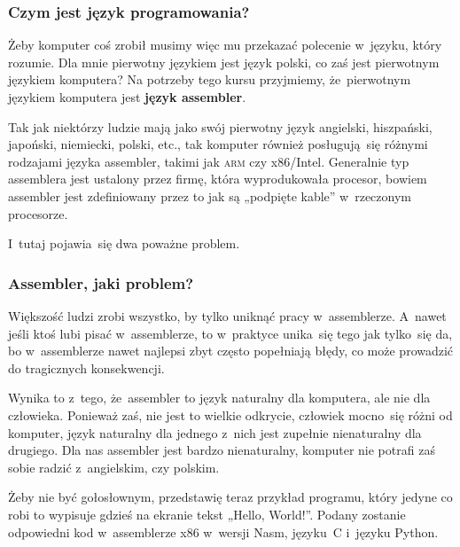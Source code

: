 \documentclass[10pt,t]{beamer}
\begin{document}
\begin{frame}
  \frametitle{Czym jest język programowania?}


  Żeby komputer coś zrobił musimy więc mu przekazać polecenie w~języku,
  który rozumie. Dla mnie pierwotny językiem jest język polski, co zaś
  jest pierwotnym językiem komputera? Na potrzeby tego kursu przyjmiemy,
  że~pierwotnym językiem komputera jest \textbf{język assembler}.

  Tak jak niektórzy ludzie mają jako swój pierwotny język angielski,
  hiszpański, japoński, niemiecki, polski, etc., tak komputer również
  posługują~się różnymi rodzajami języka assembler, takimi jak \textsc{arm}
  czy x86/Intel. Generalnie typ assemblera jest ustalony przez firmę, która
  wyprodukowała procesor, bowiem assembler jest zdefiniowany przez to jak są
  „podpięte kable” w~rzeczonym procesorze.

  I~tutaj pojawia~się dwa poważne problem.

\end{frame}





\begin{frame}
  \frametitle{Assembler, jaki problem?}


  Większość ludzi zrobi wszystko, by tylko uniknąć pracy w~assemblerze.
  A~nawet jeśli ktoś lubi pisać w~assemblerze, to w~praktyce unika~się
  tego jak tylko~się da, bo w~assemblerze nawet najlepsi zbyt często
  popełniają błędy, co może prowadzić do tragicznych konsekwencji.

  Wynika to z~tego, że~assembler to język naturalny dla \alert{komputera},
  ale nie dla człowieka. Ponieważ zaś, nie jest to wielkie odkrycie,
  człowiek mocno~się różni od komputer, język naturalny dla jednego z~nich
  jest zupełnie nienaturalny dla drugiego. Dla nas assembler jest bardzo
  nienaturalny, komputer nie potrafi zaś sobie radzić z~angielskim, czy
  polskim.

  Żeby nie być gołosłownym, przedstawię teraz przykład programu, który
  jedyne co robi to wypisuje gdzieś na ekranie tekst „Hello, World!”.
  Podany zostanie odpowiedni kod w~assemblerze x86 w~wersji Nasm, języku~C
  i~języku Python.

\end{frame}
\end{document}
